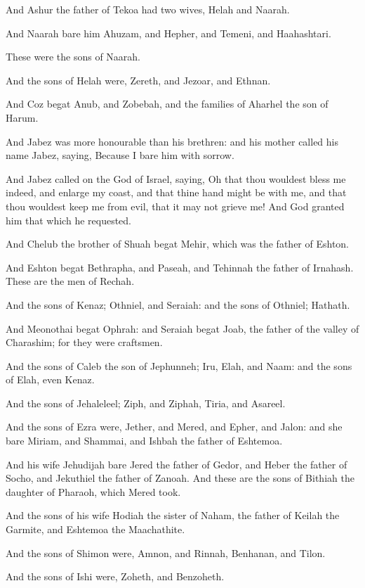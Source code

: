 \Verse And Ashur the father of Tekoa had two wives, Helah and Naarah.

\Verse And Naarah bare him Ahuzam, and Hepher, and Temeni, and Haahashtari.

These were the sons of Naarah.

\Verse And the sons of Helah were, Zereth, and Jezoar, and Ethnan.

\Verse And Coz begat Anub, and Zobebah, and the families of Aharhel the son of Harum.

\Verse And Jabez was more honourable than his brethren: and his mother called his name Jabez, saying, Because I bare him with sorrow.

\Verse And Jabez called on the God of Israel, saying, Oh that thou wouldest bless me indeed, and enlarge my coast, and that thine hand might be with me, and that thou wouldest keep me from evil, that it may not grieve me! And God granted him that which he requested.

\Verse And Chelub the brother of Shuah begat Mehir, which was the father of Eshton.

\Verse And Eshton begat Bethrapha, and Paseah, and Tehinnah the father of Irnahash. These are the men of Rechah.

\Verse And the sons of Kenaz; Othniel, and Seraiah: and the sons of Othniel; Hathath.

\Verse And Meonothai begat Ophrah: and Seraiah begat Joab, the father of the valley of Charashim; for they were craftsmen.

\Verse And the sons of Caleb the son of Jephunneh; Iru, Elah, and Naam: and the sons of Elah, even Kenaz.

\Verse And the sons of Jehaleleel; Ziph, and Ziphah, Tiria, and Asareel.

\Verse And the sons of Ezra were, Jether, and Mered, and Epher, and Jalon: and she bare Miriam, and Shammai, and Ishbah the father of Eshtemoa.

\Verse And his wife Jehudijah bare Jered the father of Gedor, and Heber the father of Socho, and Jekuthiel the father of Zanoah. And these are the sons of Bithiah the daughter of Pharaoh, which Mered took.

\Verse And the sons of his wife Hodiah the sister of Naham, the father of Keilah the Garmite, and Eshtemoa the Maachathite.

\Verse And the sons of Shimon were, Amnon, and Rinnah, Benhanan, and Tilon.

And the sons of Ishi were, Zoheth, and Benzoheth.

